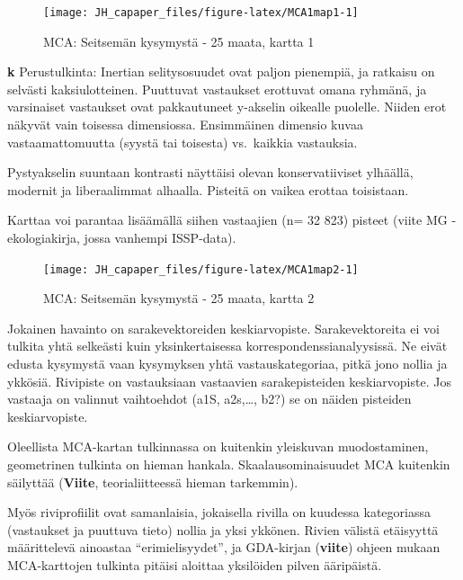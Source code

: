 \documentclass[
  finnish,
]{book}
\begin{document}
\begin{figure}

{\centering \texttt{[image: JH\_capaper\_files/figure-latex/MCA1map1-1]} 

}

\caption{MCA: Seitsemän kysymystä - 25 maata, kartta 1}\label{fig:MCA1map1}
\end{figure}

\textbf{k} Perustulkinta: Inertian selitysosuudet ovat paljon pienempiä, ja ratkaisu
on selvästi kaksiulotteinen. Puuttuvat vastaukset erottuvat omana ryhmänä, ja
varsinaiset vastaukset ovat pakkautuneet y-akselin oikealle puolelle. Niiden erot
näkyvät vain toisessa dimensiossa. Ensimmäinen dimensio kuvaa vastaamattomuutta (syystä tai toisesta) vs.~kaikkia vastauksia.

Pystyakselin suuntaan kontrasti näyttäisi olevan konservatiiviset ylhäällä,
modernit ja liberaalimmat alhaalla. Pisteitä on vaikea erottaa toisistaan.

Karttaa voi parantaa lisäämällä siihen vastaajien (n= 32 823) pisteet (viite MG - ekologiakirja, jossa vanhempi ISSP-data).

\begin{figure}

{\centering \texttt{[image: JH\_capaper\_files/figure-latex/MCA1map2-1]} 

}

\caption{MCA: Seitsemän kysymystä - 25 maata, kartta 2}\label{fig:MCA1map2}
\end{figure}

Jokainen havainto on sarakevektoreiden keskiarvopiste. Sarakevektoreita ei voi
tulkita yhtä selkeästi kuin yksinkertaisessa korrespondenssianalyysissä. Ne eivät
edusta kysymystä vaan kysymyksen yhtä vastauskategoriaa, pitkä jono nollia ja ykkösiä.
Rivipiste on vastauksiaan vastaavien sarakepisteiden keskiarvopiste. Jos vastaaja on valinnut
vaihtoehdot (a1S, a2s,\ldots, b2?) se on näiden pisteiden keskiarvopiste.

Oleellista MCA-kartan tulkinnassa on kuitenkin yleiskuvan muodostaminen, geometrinen
tulkinta on hieman hankala. Skaalausominaisuudet MCA kuitenkin säilyttää (\textbf{Viite},
teorialiitteessä hieman tarkemmin).

Myös riviprofiilit ovat samanlaisia, jokaisella rivilla on kuudessa kategoriassa (vastaukset
ja puuttuva tieto) nollia ja yksi ykkönen. Rivien välistä etäisyyttä määrittelevä ainoastaa
``erimielisyydet'', ja GDA-kirjan (\textbf{viite}) ohjeen mukaan MCA-karttojen tulkinta pitäisi aloittaa
yksilöiden pilven ääripäistä.
\end{document}
